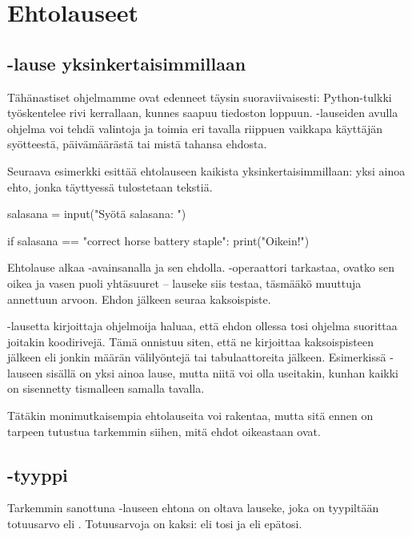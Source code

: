 \chapter{Ehtolauseet}

\section{-lause yksinkertaisimmillaan}

Tähänastiset ohjelmamme ovat edenneet täysin suoraviivaisesti: Python-tulkki työskentelee rivi kerrallaan, kunnes saapuu tiedoston loppuun. -lauseiden avulla ohjelma voi tehdä valintoja ja toimia eri tavalla riippuen vaikkapa käyttäjän syötteestä, päivämäärästä tai mistä tahansa ehdosta.

Seuraava esimerkki esittää ehtolauseen kaikista yksinkertaisimmillaan: yksi ainoa ehto, jonka täyttyessä tulostetaan tekstiä.

\begin{python}
salasana = input("Syötä salasana: ")

if salasana == "correct horse battery staple":
	print("Oikein!")
\end{python}

Ehtolause alkaa -avainsanalla ja sen ehdolla. \code{==}-operaattori tarkastaa, ovatko sen oikea ja vasen puoli yhtäsuuret – lauseke  siis testaa, täsmääkö muuttuja  annettuun arvoon. Ehdon jälkeen seuraa kaksoispiste.

-lausetta kirjoittaja ohjelmoija haluaa, että ehdon ollessa tosi ohjelma suorittaa joitakin koodirivejä. Tämä onnistuu siten, että ne kirjoittaa kaksoispisteen jälkeen  eli jonkin määrän välilyöntejä tai tabulaattoreita jälkeen. Esimerkissä -lauseen sisällä on yksi ainoa lause, mutta niitä voi olla useitakin, kunhan kaikki on sisennetty tismalleen samalla tavalla.

Tätäkin monimutkaisempia ehtolauseita voi rakentaa, mutta sitä ennen on tarpeen tutustua tarkemmin siihen, mitä ehdot oikeastaan ovat.

\section{-tyyppi}

Tarkemmin sanottuna -lauseen ehtona on oltava lauseke, joka on tyypiltään totuusarvo eli . Totuusarvoja on kaksi:  eli tosi ja  eli epätosi.

